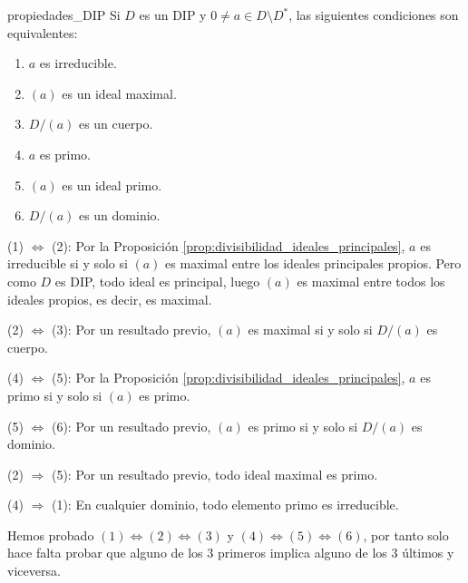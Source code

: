 \begin{proposition}{}{propiedades_DIP}
Si \(D\) es un DIP y \(0 \neq a \in D \setminus D^*\), las siguientes condiciones son equivalentes:

\begin{enumerate}
\item \(a\) es irreducible.

\item \((a)\) es un ideal maximal.

\item \(D/(a)\) es un cuerpo.

\item \(a\) es primo.

\item \((a)\) es un ideal primo.

\item \(D/(a)\) es un dominio.
\end{enumerate}

\end{proposition}

\begin{proofbox}

(1) \(\Leftrightarrow\) (2): Por la Proposición \ref{prop:divisibilidad_ideales_principales}, \(a\) es irreducible si y solo si \((a)\) es maximal entre los ideales principales propios. Pero como \(D\) es DIP, todo ideal es principal, luego \((a)\) es maximal entre todos los ideales propios, es decir, es maximal.

(2) \(\Leftrightarrow\) (3): Por un resultado previo, \((a)\) es maximal si y solo si \(D/(a)\) es cuerpo.

(4) \(\Leftrightarrow\) (5): Por la Proposición \ref{prop:divisibilidad_ideales_principales}, \(a\) es primo si y solo si \((a)\) es primo.

(5) \(\Leftrightarrow\) (6): Por un resultado previo, \((a)\) es primo si y solo si \(D/(a)\) es dominio.

(2) \(\Rightarrow\) (5): Por un resultado previo, todo ideal maximal es primo.

(4) \(\Rightarrow\) (1): En cualquier dominio, todo elemento primo es irreducible.
\end{proofbox}

\begin{remark}
    Hemos probado $(1) \Leftrightarrow (2) \Leftrightarrow (3)$ y $(4) \Leftrightarrow (5) \Leftrightarrow (6)$, por tanto solo hace falta probar que alguno de los 3 primeros implica alguno de los 3 últimos y viceversa.
\end{remark}

